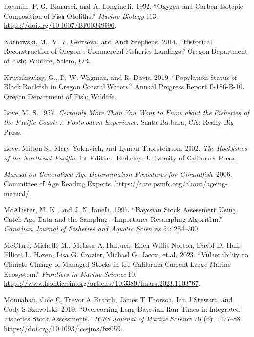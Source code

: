 \documentclass[11pt,
  english,
  letterpaper,
]{article}
\newlength{\cslhangindent}
\newenvironment{CSLReferences}[2] %
 {%
  \setlength{\parindent}{0pt}
  \ifodd #1 \everypar{\setlength{\hangindent}{\cslhangindent}}\ignorespaces\fi
  \ifnum #2 > 0
  \setlength{\parskip}{#2\baselineskip}
  \fi
 }%
 {}
\begin{document}
\begin{CSLReferences}{1}{0}
\leavevmode{}%
Iacumin, P, G. Bianucci, and A. Longinelli. 1992. {``Oxygen and Carbon Isotopic Composition of Fish Otoliths.''} \emph{Marine Biology} 113. \url{https://doi.org/10.1007/BF00349696}.

\leavevmode{}%
Karnowski, M., V. V. Gertseva, and Andi Stephens. 2014. {``Historical {Reconstruction} of {Oregon}'s {Commercial} {Fisheries} {Landings}.''} Oregon Department of Fish; Wildlife, Salem, OR.

\leavevmode{}%
Krutzikowksy, G., D. W. Wagman, and R. Davis. 2019. {``Population Status of Black Rockfish in Oregon Coastal Waters.''} Annual Progress Report F-186-R-10. Oregon Department of Fish; Wildlife.

\leavevmode{}%
Love, M. S. 1957. \emph{Certainly More Than You Want to Know about the Fisheries of the Pacific Coast: A Postmodern Experience}. Santa Barbara, CA: Really Big Press.

\leavevmode{}%
Love, Milton S., Mary Yoklavich, and Lyman Thorsteinson. 2002. \emph{The Rockfishes of the Northeast Pacific}. 1st Edition. Berkeley: University of California Press.

\leavevmode{}%
\emph{Manual on Generalized Age Determination Procedures for Groundfish}. 2006. Committee of Age Reading Experts. \url{https://care.psmfc.org/about/ageing-manual/}.

\leavevmode{}%
McAllister, M. K., and J. N. Ianelli. 1997. {``Bayesian Stock Assessment Using Catch-Age Data and the Sampling - Importance Resampling Algorithm.''} \emph{Canadian Journal of Fisheries and Aquatic Sciences} 54: 284--300.

\leavevmode{}%
McClure, Michelle M., Melissa A. Haltuch, Ellen Willis-Norton, David D. Huff, Elliott L. Hazen, Lisa G. Crozier, Michael G. Jacox, et al. 2023. {``Vulnerability to Climate Change of Managed Stocks in the California Current Large Marine Ecosystem.''} \emph{Frontiers in Marine Science} 10. \url{https://www.frontiersin.org/articles/10.3389/fmars.2023.1103767}.

\leavevmode{}%
Monnahan, Cole C, Trevor A Branch, James T Thorson, Ian J Stewart, and Cody S Szuwalski. 2019. {``Overcoming Long Bayesian Run Times in Integrated Fisheries Stock Assessments.''} \emph{{ICES} Journal of Marine Science} 76 (6): 1477--88. \url{https://doi.org/10.1093/icesjms/fsz059}.


\end{CSLReferences}
\end{document}
